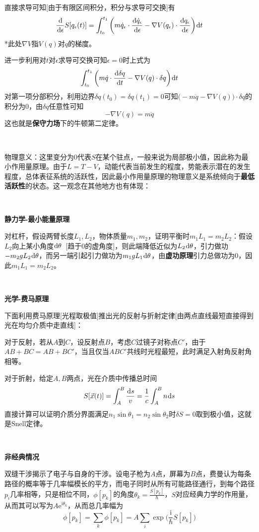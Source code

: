 \documentclass[a4paper,UTF8,fontset=windows]{ctexart}
\newcommand*{\dr}{\hspace{0.07em}\mathrm{d}}
\begin{document}
直接求导可知[由于有限区间积分，积分与求导可交换]有
$$\frac{\dr}{\dr\epsilon}S[q_\epsilon(t)]=\int_{t_0}^{t_1}\bigg(m\dot{q}_\epsilon\cdot\frac{\dr\dot{q}_\epsilon}{\dr\epsilon}-\nabla V(q_\epsilon)\cdot\frac{\dr q_\epsilon}{\dr\epsilon}\bigg)\dr t$$
*此处$\nabla V$指$V(q)$对$q$的梯度。

进一步利用对$t$对$\epsilon$求导可交换可知$\epsilon=0$时上式为
$$\int_{t_0}^{t_1}\bigg(m\dot{q}\cdot\frac{\dr\delta q}{\dr t}-\nabla V(q)\cdot\delta q\bigg)\dr t$$
对第一项分部积分，利用边界$\delta q(t_0)=\delta q(t_1)=0$可知$\big(-m\ddot{q}-\nabla V(q)\big)\cdot\delta q$的积分为0，由$\delta q$任意性可知
$$-\nabla V(q)=m\ddot{q}$$
这也就是\textbf{保守力场}下的牛顿第二定律。

\

物理意义：这里变分为0代表$S$在某个驻点，一般来说为局部极小值，因此称为最小作用量原理。由于$L=T-V$，动能代表当前发生的程度，势能表示潜在的发生程度，总体表征系统的活跃性，因此最小作用量原理的物理意义是系统倾向于\textbf{最低活跃性}的状态。这一观念在其他地方也有体现：

\

\textbf{静力学-最小能量原理}

对杠杆，假设两臂长度$L_1,L_2$，物体质量$m_1,m_2$，证明平衡时$m_1L_1=m_2L_2$：假设$L_2$向上某小角度$\dr\theta$\ [趋于0的虚角度]，则此端降低近似为$L_2\dr\theta$，引力做功$-m_2gL_2\dr\theta$，而另一端引起引力做功为$m_1gL_1\dr\theta$，由\textbf{虚功原理}引力总做功为0，因此$m_1L_1=m_2L_2$。

\

\textbf{光学-费马原理}

下面利用费马原理[光程取极值]推出光的反射与折射定律[由两点直线最短直接得到光在均匀介质中走直线]：

对于反射，若从$A$到$C$，设反射点$B$，考虑$C$过镜子对称点$C'$，由于$AB+BC=AB+BC'$，当且仅当$ABC'$共线时光程最短，此时满足入射角反射角相等。

对于折射，给定$A,B$两点，光在介质中传播总时间
$$S[\vec{x}(t)]=\int_A^B\frac{\dr s}{v}=\frac{1}{c}\int_A^Bn\dr s$$
直接计算可以证明介质分界面满足$n_1\sin\theta_1=n_2\sin\theta_2$时$\delta S=0$取到极小值，这就是Snell定律。

\

\textbf{非经典情况}

双缝干涉揭示了电子与自身的干涉。设电子枪为$A$点，屏幕为$B$点，费曼认为每条路径的概率等于几率幅模长的平方，而电子同时从所有可能路径通行，到每个路径$p_i$几率相等，只是相位不同，$\phi[p_k]$的角度$\theta_k=\frac{S[p_k]}{\hbar}$，$S$对应经典力学的作用量，从而其可以写为$A\mathrm{e}^{\mathrm{i}\theta_k}$，从而总几率幅为
$$\phi[p_k]=\sum_k\phi[p_k]=A\sum_i\exp\bigg(\frac{\mathrm{i}}{\hbar}S[p_k]\bigg)$$
\end{document}
